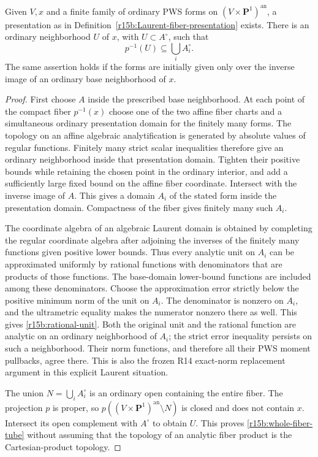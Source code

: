 \begin{lemma}
\label{r15b:Laurent-fiber-exists}
Given $V,x$ and a finite family of ordinary PWS forms on
$(V\times\mathbf P^1)^{\mathrm{an}}$, a presentation as in
Definition~\ref{r15b:Laurent-fiber-presentation} exists. There is
an ordinary neighborhood $U$ of $x$, with $U\subset A^\circ$,
such that
\[
                 p^{-1}(U)\subseteq\bigcup_i A_i^\circ.
\tag{SP15.4}\label{r15b:whole-fiber-tube}
\]
The same assertion holds if the forms are initially given only
over the inverse image of an ordinary base neighborhood of $x$.
\end{lemma}

\begin{proof}
First choose $A$ inside the prescribed base neighborhood. At each
point of the compact fiber $p^{-1}(x)$ choose one of the two affine
fiber charts and a simultaneous ordinary presentation domain for
the finitely many forms. The topology on an affine algebraic
analytification is generated by absolute values of regular
functions. Finitely many strict scalar inequalities therefore give
an ordinary neighborhood inside that presentation domain.
Tighten their positive bounds while retaining the chosen point in
the ordinary interior, and add a sufficiently large fixed bound
on the affine fiber coordinate. Intersect with the inverse image
of $A$. This gives a domain $A_i$ of the stated form inside the
presentation domain. Compactness of the fiber gives finitely many
such $A_i$.

The coordinate algebra of an algebraic Laurent domain is obtained
by completing the regular coordinate algebra after adjoining the
inverses of the finitely many functions given positive lower
bounds. Thus every analytic unit on $A_i$ can be approximated
uniformly by rational functions with denominators that are products
of those functions. The base-domain lower-bound functions are
included among these denominators. Choose the approximation error
strictly below the positive minimum norm of the unit on $A_i$.
The denominator is nonzero on $A_i$, and the ultrametric equality
makes the numerator nonzero there as well. This gives
\eqref{r15b:rational-unit}. Both the original unit and the rational
function are analytic on an ordinary neighborhood of $A_i$;
the strict error inequality persists on such a neighborhood.
Their norm functions, and therefore all their PWS moment
pullbacks, agree there. This is also the frozen R14 exact-norm
replacement argument in this explicit Laurent situation.

The union $N=\bigcup_i A_i^\circ$ is an ordinary open containing
the entire fiber. The projection $p$ is proper, so
$p((V\times\mathbf P^1)^{\mathrm{an}}\setminus N)$ is closed
and does not contain $x$. Intersect its open complement with
$A^\circ$ to obtain $U$. This proves
\eqref{r15b:whole-fiber-tube} without assuming that the topology of
an analytic fiber product is the Cartesian-product topology.
\end{proof}


